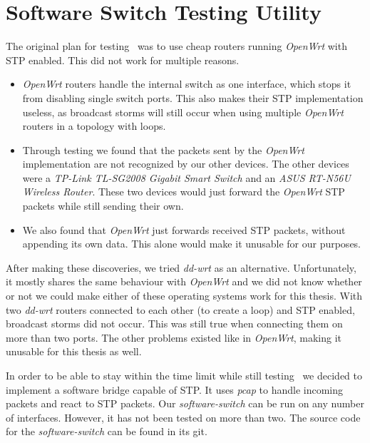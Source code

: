 \chapter{Software Switch Testing Utility}
\label{switch}
The original plan for testing \tool\ was to use cheap routers running \textit{OpenWrt}\cite{OpenWrt} with STP enabled.
This did not work for multiple reasons.
\begin{itemize}
    \item \textit{OpenWrt} routers handle the internal switch as one interface, which stops it from disabling single switch ports.
        This also makes their STP implementation useless, as broadcast storms will still occur when using multiple \textit{OpenWrt} routers in a topology with loops.
    \item Through testing we found that the packets sent by the \textit{OpenWrt} implementation are not recognized by our other devices.
    The other devices were a \textit{TP-Link TL-SG2008 Gigabit Smart Switch} and an \textit{ASUS RT-N56U Wireless Router}.
    These two devices would just forward the \textit{OpenWrt} STP packets while still sending their own.
    \item We also found that \textit{OpenWrt} just forwards received STP packets, without appending its own data.
    This alone would make it unusable for our purposes.
\end{itemize}

After making these discoveries, we tried \textit{dd-wrt}\cite{dd-wrt} as an alternative.
Unfortunately, it mostly shares the same behaviour with \textit{OpenWrt} and we did not know whether or not we could make either of these operating systems work for this thesis.
With two \textit{dd-wrt} routers connected to each other (to create a loop) and STP enabled, broadcast storms did not occur.
This was still true when connecting them on more than two ports.
The other problems existed like in \textit{OpenWrt}, making it unusable for this thesis as well.

In order to be able to stay within the time limit while still testing \tool\, we decided to implement a software bridge capable of STP.
It uses \textit{pcap} to handle incoming packets and react to STP packets.
Our \textit{software-switch} can be run on any number of interfaces.
However, it has not been tested on more than two.
The source code for the \textit{software-switch} can be found in its git\cite{soft-switch}.

